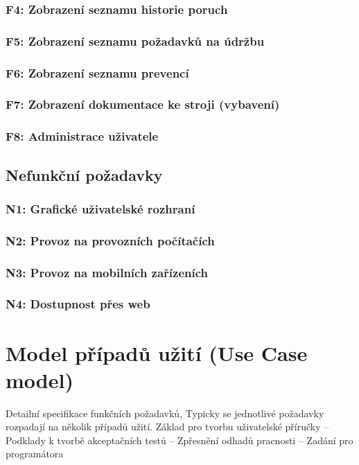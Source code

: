 \documentclass[thesis=M,czech]{FITthesis}[2012/06/26]
\begin{document}
\subsubsection{F4: Zobrazení seznamu historie poruch}
\subsubsection{F5: Zobrazení seznamu požadavků na údržbu}
\subsubsection{F6: Zobrazení seznamu prevencí}
\subsubsection{F7: Zobrazení dokumentace ke stroji (vybavení)}
\subsubsection{F8: Administrace uživatele}


\subsection{Nefunkční požadavky}

\subsubsection{N1: Grafické uživatelské rozhraní}
\subsubsection{N2: Provoz na provozních počítačích}
\subsubsection{N3: Provoz na mobilních zařízeních}
\subsubsection{N4: Dostupnost přes web}

\section{Model případů užití (Use Case model)}
Detailní specifikace funkčních požadavků, Typicky se jednotlivé požadavky rozpadají na několik případů užití. Základ pro tvorbu uživatelské příručky
– Podklady k tvorbě akceptačních testů
– Zpřesnění odhadů pracnosti
– Zadání pro programátora
\end{document}
